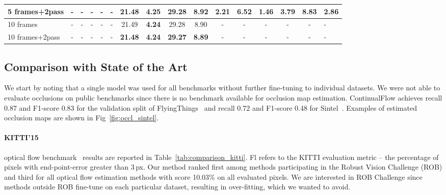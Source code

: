 \documentclass[runningheads]{llncs}
\begin{document}
\begin{table}[]
\begin{adjustbox}{max width=\textwidth}
\begin{tabular}{l|ccccc|cc|cc|ccc|ccc}
 \multicolumn{1}{|l|}{5 frames+2pass}& - & - & - & - & - &  \textbf{21.48} & \textbf{4.25} & 29.28 & \textbf{8.92} & \textbf{2.21} & 6.52 & 1.46 & \textbf{3.79} & \textbf{8.83} & \multicolumn{1}{|l|}{\textbf{2.86}} \\ \hline
 \multicolumn{1}{|l|}{10 frames}& - & - & - & - & - & 21.49 & \textbf{4.24} & 29.28 & 8.90 & - & - & - & - & - & \multicolumn{1}{|l|}{-} \\
 \multicolumn{1}{|l|}{10 frames+2pass}& - & - & - & - & - & \textbf{21.48} & \textbf{4.24} & \textbf{29.27} & \textbf{8.89} & - & - & - & - & - & \multicolumn{1}{|l|}{-} \\\hline
\end{tabular}
\end{adjustbox}
\end{table}


\subsection{Comparison with State of the Art}
We start by noting that a single model was used for all benchmarks without further fine-tuning to individual datasets.
We were not able to evaluate occlusions on public benchmarks since there is no benchmark available for occlusion map estimation.
ContinualFlow achieves recall 0.87 and F1-score 0.83 for the validation split of FlyingThings~\cite{Mayer2016} and recall 0.72 and F1-score 0.48 for Sintel~\cite{Butler2012}. Examples of estimated occlusion maps are shown in Fig~\ref{fig:occl_sintel}.

\paragraph{\bf\textbf{KITTI'15}} optical flow benchmark~\cite{Menze2015}
results are reported in Table~\ref{tab:comparison_kitti}.
Fl refers to the KITTI evaluation metric -- the percentage of pixels with end-point-error greater than 3\,px.
Our method ranked first among methods participating in the Robust Vision Challenge (ROB) and third for all optical flow estimation methods with score 10.03\% on all evaluated pixels.
We are interested in ROB Challenge since methods outside ROB fine-tune on each particular dataset, resulting in over-fitting, which we wanted to avoid.
\end{document}
